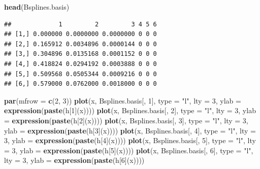 \documentclass[
]{book}
\newenvironment{Shaded}{\begin{snugshade}}{\end{snugshade}}
\newcommand{\AttributeTok}[1]{\textcolor[rgb]{0.13,0.29,0.53}{#1}}
\newcommand{\DecValTok}[1]{\textcolor[rgb]{0.00,0.00,0.81}{#1}}
\newcommand{\FunctionTok}[1]{\textcolor[rgb]{0.13,0.29,0.53}{\textbf{#1}}}
\newcommand{\NormalTok}[1]{#1}
\newcommand{\StringTok}[1]{\textcolor[rgb]{0.31,0.60,0.02}{#1}}
\begin{document}
\begin{Shaded}
\begin{Highlighting}[]
\FunctionTok{head}\NormalTok{(Bsplines.basis)}
\end{Highlighting}
\end{Shaded}

\begin{verbatim}
##             1         2         3 4 5 6
## [1,] 0.000000 0.0000000 0.0000000 0 0 0
## [2,] 0.165912 0.0034896 0.0000144 0 0 0
## [3,] 0.304896 0.0135168 0.0001152 0 0 0
## [4,] 0.418824 0.0294192 0.0003888 0 0 0
## [5,] 0.509568 0.0505344 0.0009216 0 0 0
## [6,] 0.579000 0.0762000 0.0018000 0 0 0
\end{verbatim}

\begin{Shaded}
\begin{Highlighting}[]
\FunctionTok{par}\NormalTok{(}\AttributeTok{mfrow =} \FunctionTok{c}\NormalTok{(}\DecValTok{2}\NormalTok{, }\DecValTok{3}\NormalTok{))}
\FunctionTok{plot}\NormalTok{(x, Bsplines.basis[, }\DecValTok{1}\NormalTok{], }\AttributeTok{type =} \StringTok{"l"}\NormalTok{, }\AttributeTok{lty =} \DecValTok{3}\NormalTok{, }\AttributeTok{ylab =} \FunctionTok{expression}\NormalTok{(}\FunctionTok{paste}\NormalTok{(h[}\DecValTok{1}\NormalTok{](x))))}
\FunctionTok{plot}\NormalTok{(x, Bsplines.basis[, }\DecValTok{2}\NormalTok{], }\AttributeTok{type =} \StringTok{"l"}\NormalTok{, }\AttributeTok{lty =} \DecValTok{3}\NormalTok{, }\AttributeTok{ylab =} \FunctionTok{expression}\NormalTok{(}\FunctionTok{paste}\NormalTok{(h[}\DecValTok{2}\NormalTok{](x))))}
\FunctionTok{plot}\NormalTok{(x, Bsplines.basis[, }\DecValTok{3}\NormalTok{], }\AttributeTok{type =} \StringTok{"l"}\NormalTok{, }\AttributeTok{lty =} \DecValTok{3}\NormalTok{, }\AttributeTok{ylab =} \FunctionTok{expression}\NormalTok{(}\FunctionTok{paste}\NormalTok{(h[}\DecValTok{3}\NormalTok{](x))))}
\FunctionTok{plot}\NormalTok{(x, Bsplines.basis[, }\DecValTok{4}\NormalTok{], }\AttributeTok{type =} \StringTok{"l"}\NormalTok{, }\AttributeTok{lty =} \DecValTok{3}\NormalTok{, }\AttributeTok{ylab =} \FunctionTok{expression}\NormalTok{(}\FunctionTok{paste}\NormalTok{(h[}\DecValTok{4}\NormalTok{](x))))}
\FunctionTok{plot}\NormalTok{(x, Bsplines.basis[, }\DecValTok{5}\NormalTok{], }\AttributeTok{type =} \StringTok{"l"}\NormalTok{, }\AttributeTok{lty =} \DecValTok{3}\NormalTok{, }\AttributeTok{ylab =} \FunctionTok{expression}\NormalTok{(}\FunctionTok{paste}\NormalTok{(h[}\DecValTok{5}\NormalTok{](x))))}
\FunctionTok{plot}\NormalTok{(x, Bsplines.basis[, }\DecValTok{6}\NormalTok{], }\AttributeTok{type =} \StringTok{"l"}\NormalTok{, }\AttributeTok{lty =} \DecValTok{3}\NormalTok{, }\AttributeTok{ylab =} \FunctionTok{expression}\NormalTok{(}\FunctionTok{paste}\NormalTok{(h[}\DecValTok{6}\NormalTok{](x))))}
\end{Highlighting}
\end{Shaded}
\end{document}
